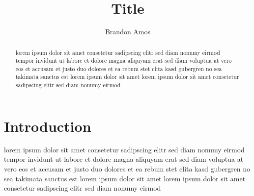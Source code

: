 \documentclass{article} %
\title{Title}
\author{Brandon Amos}
\begin{document}
\maketitle

\begin{abstract}
lorem ipsum dolor sit amet consetetur sadipscing elitr sed diam nonumy
eirmod tempor invidunt ut labore et dolore magna aliquyam erat sed diam
voluptua at vero eos et accusam et justo duo dolores et ea rebum stet clita
kasd gubergren no sea takimata sanctus est lorem ipsum dolor sit amet lorem
ipsum dolor sit amet consetetur sadipscing elitr sed diam nonumy eirmod
\end{abstract}

\section{Introduction}
lorem ipsum dolor sit amet consetetur sadipscing elitr sed diam nonumy
eirmod tempor invidunt ut labore et dolore magna aliquyam erat sed diam
voluptua at vero eos et accusam et justo duo dolores
et ea rebum stet clita\cite{article}
kasd gubergren no sea takimata sanctus est lorem ipsum dolor sit amet lorem
ipsum dolor sit amet consetetur sadipscing elitr sed diam nonumy eirmod



\end{document}

